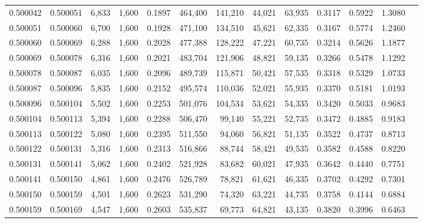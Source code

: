 \begin{tabular}{rrrrrrrrrrrrr}
0.500042 & 0.500051 &  6,833 & 1,600 &                                     0.1897 & 464,400 & 141,210 &  44,021 &  63,935 & 0.3117 & 0.5922 & 1.3080 \\
0.500051 & 0.500060 &  6,700 & 1,600 &                                     0.1928 & 471,100 & 134,510 &  45,621 &  62,335 & 0.3167 & 0.5774 & 1.2460 \\
0.500060 & 0.500069 &  6,288 & 1,600 &                                     0.2028 & 477,388 & 128,222 &  47,221 &  60,735 & 0.3214 & 0.5626 & 1.1877 \\
0.500069 & 0.500078 &  6,316 & 1,600 &                                     0.2021 & 483,704 & 121,906 &  48,821 &  59,135 & 0.3266 & 0.5478 & 1.1292 \\
0.500078 & 0.500087 &  6,035 & 1,600 &                                     0.2096 & 489,739 & 115,871 &  50,421 &  57,535 & 0.3318 & 0.5329 & 1.0733 \\
0.500087 & 0.500096 &  5,835 & 1,600 &                                     0.2152 & 495,574 & 110,036 &  52,021 &  55,935 & 0.3370 & 0.5181 & 1.0193 \\
0.500096 & 0.500104 &  5,502 & 1,600 &                                     0.2253 & 501,076 & 104,534 &  53,621 &  54,335 & 0.3420 & 0.5033 & 0.9683 \\
0.500104 & 0.500113 &  5,394 & 1,600 &                                     0.2288 & 506,470 &  99,140 &  55,221 &  52,735 & 0.3472 & 0.4885 & 0.9183 \\
0.500113 & 0.500122 &  5,080 & 1,600 &                                     0.2395 & 511,550 &  94,060 &  56,821 &  51,135 & 0.3522 & 0.4737 & 0.8713 \\
0.500122 & 0.500131 &  5,316 & 1,600 &                                     0.2313 & 516,866 &  88,744 &  58,421 &  49,535 & 0.3582 & 0.4588 & 0.8220 \\
0.500131 & 0.500141 &  5,062 & 1,600 &                                     0.2402 & 521,928 &  83,682 &  60,021 &  47,935 & 0.3642 & 0.4440 & 0.7751 \\
0.500141 & 0.500150 &  4,861 & 1,600 &                                     0.2476 & 526,789 &  78,821 &  61,621 &  46,335 & 0.3702 & 0.4292 & 0.7301 \\
0.500150 & 0.500159 &  4,501 & 1,600 &                                     0.2623 & 531,290 &  74,320 &  63,221 &  44,735 & 0.3758 & 0.4144 & 0.6884 \\
0.500159 & 0.500169 &  4,547 & 1,600 &                                     0.2603 & 535,837 &  69,773 &  64,821 &  43,135 & 0.3820 & 0.3996 & 0.6463 \\

\end{tabular}
